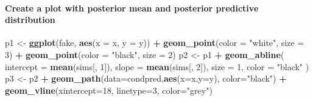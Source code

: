 \documentclass[
]{article}
\newenvironment{Shaded}{\begin{snugshade}}{\end{snugshade}}
\newcommand{\ControlFlowTok}[1]{\textcolor[rgb]{0.13,0.29,0.53}{\textbf{#1}}}
\newcommand{\DataTypeTok}[1]{\textcolor[rgb]{0.13,0.29,0.53}{#1}}
\newcommand{\DecValTok}[1]{\textcolor[rgb]{0.00,0.00,0.81}{#1}}
\newcommand{\KeywordTok}[1]{\textcolor[rgb]{0.13,0.29,0.53}{\textbf{#1}}}
\newcommand{\NormalTok}[1]{#1}
\newcommand{\OperatorTok}[1]{\textcolor[rgb]{0.81,0.36,0.00}{\textbf{#1}}}
\newcommand{\StringTok}[1]{\textcolor[rgb]{0.31,0.60,0.02}{#1}}
\begin{document}
\begin{Shaded}
\end{Shaded}

\hypertarget{create-a-plot-with-posterior-mean-and-posterior-predictive-distribution}{%
\paragraph{Create a plot with posterior mean and posterior predictive
distribution}\label{create-a-plot-with-posterior-mean-and-posterior-predictive-distribution}}

\begin{Shaded}
\begin{Highlighting}[]
\NormalTok{p1 <-}\StringTok{ }\KeywordTok{ggplot}\NormalTok{(fake, }\KeywordTok{aes}\NormalTok{(}\DataTypeTok{x =}\NormalTok{ x, }\DataTypeTok{y =}\NormalTok{ y)) }\OperatorTok{+}
\StringTok{  }\KeywordTok{geom_point}\NormalTok{(}\DataTypeTok{color =} \StringTok{"white"}\NormalTok{, }\DataTypeTok{size =} \DecValTok{3}\NormalTok{) }\OperatorTok{+}
\StringTok{  }\KeywordTok{geom_point}\NormalTok{(}\DataTypeTok{color =} \StringTok{"black"}\NormalTok{, }\DataTypeTok{size =} \DecValTok{2}\NormalTok{)}
\NormalTok{p2 <-}\StringTok{ }\NormalTok{p1 }\OperatorTok{+}
\StringTok{  }\KeywordTok{geom_abline}\NormalTok{(}
    \DataTypeTok{intercept =} \KeywordTok{mean}\NormalTok{(sims[, }\DecValTok{1}\NormalTok{]),}
    \DataTypeTok{slope =} \KeywordTok{mean}\NormalTok{(sims[, }\DecValTok{2}\NormalTok{]),}
    \DataTypeTok{size =} \DecValTok{1}\NormalTok{,}
    \DataTypeTok{color =} \StringTok{"black"}
\NormalTok{  )}
\NormalTok{p3 <-}\StringTok{ }\NormalTok{p2 }\OperatorTok{+}\StringTok{ }
\StringTok{  }\KeywordTok{geom_path}\NormalTok{(}\DataTypeTok{data=}\NormalTok{condpred,}\KeywordTok{aes}\NormalTok{(}\DataTypeTok{x=}\NormalTok{x,}\DataTypeTok{y=}\NormalTok{y), }\DataTypeTok{color=}\StringTok{"black"}\NormalTok{) }\OperatorTok{+}
\StringTok{  }\KeywordTok{geom_vline}\NormalTok{(}\DataTypeTok{xintercept=}\DecValTok{18}\NormalTok{, }\DataTypeTok{linetype=}\DecValTok{3}\NormalTok{, }\DataTypeTok{color=}\StringTok{"grey"}\NormalTok{)}
\end{Highlighting}
\end{Shaded}
\end{document}

